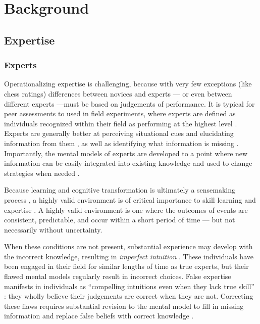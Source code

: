 
\chapter{Background}

\section{Expertise}

\subsection{Experts}

Operationalizing expertise is challenging, because with very few exceptions (like chess ratings) differences between novices and experts --- or even between different experts ---must be based on judgements of performance. It is typical for peer assessments to used in field experiments, where experts are defined as individuals recognized within their field as performing at the highest level \citep{Kahneman2009}. Experts are generally better at perceiving situational cues and elucidating information from them \citep{Nee2006, Klein1999}, as well as identifying what information is missing \citep{Klein1992}. Importantly, the mental models of experts are developed to a point where new information can be easily integrated into existing knowledge and used to change strategies when needed \citep{Glaser1996}.

Because learning and cognitive transformation is ultimately a sensemaking process \citep{Klein2006}, a highly valid environment is of critical importance to skill learning and expertise \citep{Kahneman2009}. A highly valid environment is one where the outcomes of events are consistent, predictable, and occur within a short period of time — but not necessarily without uncertainty.

When these conditions are not present, substantial experience may develop with the incorrect knowledge, resulting in \emph{imperfect intuition} \citep{Kahneman2009}. These individuals have been engaged in their field for similar lengths of time as true experts, but their flawed mental models regularly result in incorrect choices. False expertise manifests in individuals as ``compelling intuitions even when they lack true skill'' \citep{Kahneman2009}: they wholly believe their judgements are correct when they are not. Correcting these flaws requires substantial revision to the mental model to fill in missing information and replace false beliefs with correct knowledge \citep{Klein2006, Chi2008}.

